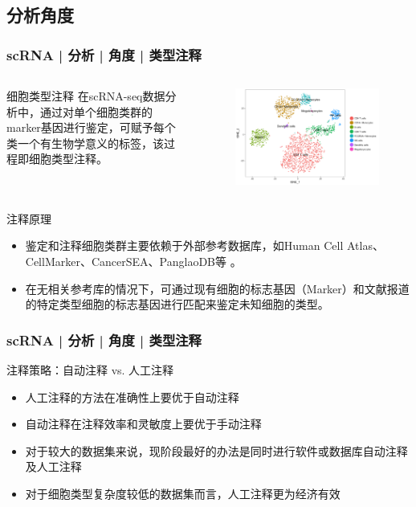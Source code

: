 \documentclass[11pt]{ctexbeamer}
\begin{document}
\subsection{分析角度}

\begin{frame}
	\frametitle{scRNA | 分析 | 角度 | 类型注释}
	\begin{columns}
	\begin{block}{细胞类型注释}
		在scRNA-seq数据分析中，通过对单个细胞类群的marker基因进行鉴定，可赋予每个类一个有生物学意义的标签，该过程即细胞类型注释。
	\end{block}
  	\begin{figure}
	\includegraphics[width=\textwidth]{scRNA_celltype_01.png}
\end{figure}
\end{columns}
\pause
    \begin{block}{注释原理}
    	\begin{itemize}
    		\item 鉴定和注释细胞类群主要依赖于外部参考数据库，如Human Cell Atlas、CellMarker、CancerSEA、PanglaoDB等 。
    		\item 在无相关参考库的情况下，可通过现有细胞的标志基因（Marker）和文献报道的特定类型细胞的标志基因进行匹配来鉴定未知细胞的类型。
    	\end{itemize}
    \end{block}
\end{frame}

\begin{frame}
	\frametitle{scRNA | 分析 | 角度 | 类型注释}
	\begin{block}{注释策略：自动注释 vs. 人工注释}
		\begin{itemize}
			\item 人工注释的方法在准确性上要优于自动注释
			\item 自动注释在注释效率和灵敏度上要优于手动注释
			\item 对于较大的数据集来说，现阶段最好的办法是同时进行软件或数据库自动注释及人工注释
			\item 对于细胞类型复杂度较低的数据集而言，人工注释更为经济有效
		\end{itemize}
	\end{block}
\end{frame}
\end{document}
